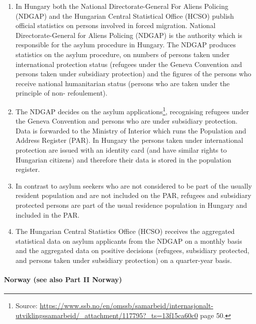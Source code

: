 \documentclass[
]{article}
\begin{document}
\begin{enumerate}
\def\labelenumi{\arabic{enumi}.}
\setcounter{enumi}{158}
\item
  In Hungary both the National Directorate-General For Aliens
  Policing (NDGAP) and the Hungarian Central Statistical Office (HCSO)
  publish official statistics on persons involved in forced migration.
  National Directorate-General for Aliens Policing (NDGAP) is the
  authority which is responsible for the asylum procedure in Hungary.
  The NDGAP produces statistics on the asylum procedure, on numbers of
  persons taken under international protection status (refugees under
  the Geneva Convention and persons taken under subsidiary protection)
  and the figures of the persons who receive national humanitarian
  status (persons who are taken under the principle of non-
  refoulement).
\item
  The NDGAP decides on the asylum applications\footnote{Source:
    \url{https://www.ssb.no/en/omssb/samarbeid/internasjonalt-utviklingssamarbeid/_attachment/117795?_ts=13f15ca60c0}
    page 50.}, recognising
  refugees under the Geneva Convention and persons who are under
  subsidiary protection. Data is forwarded to the Ministry of Interior
  which runs the Population and Address Register (PAR). In Hungary the
  persons taken under international protection are issued with an
  identity card (and have similar rights to Hungarian citizens) and
  therefore their data is stored in the population register.
\item
  In contrast to asylum seekers who are not considered to be part of
  the usually resident population and are not included on the PAR,
  refugees and subsidiary protected persons are part of the usual
  residence population in Hungary and included in the PAR.
\item
  The Hungarian Central Statistics Office (HCSO) receives the
  aggregated statistical data on asylum applicants from the NDGAP on a
  monthly basis and the aggregated data on positive decisions
  (refugees, subsidiary protected, and persons taken under subsidiary
  protection) on a quarter-year basis.
\end{enumerate}

\hypertarget{norway-see-also-part-ii-norway}{%
\paragraph{Norway (see also Part II Norway)}\label{norway-see-also-part-ii-norway}}
\end{document}
